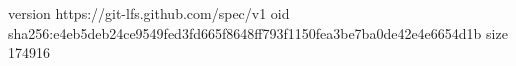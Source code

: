 version https://git-lfs.github.com/spec/v1
oid sha256:e4eb5deb24ce9549fed3fd665f8648ff793f1150fea3be7ba0de42e4e6654d1b
size 174916
